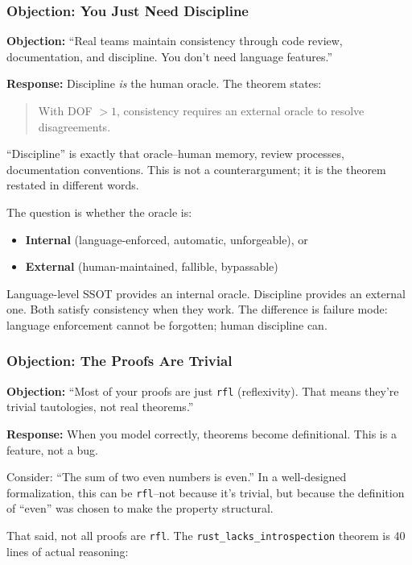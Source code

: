 \subsubsection{Objection: You Just Need Discipline}

\textbf{Objection:} ``Real teams maintain consistency through code review, documentation, and discipline. You don't need language features.''

\textbf{Response:} Discipline \emph{is} the human oracle. The theorem states:

\begin{quote}
With DOF $> 1$, consistency requires an external oracle to resolve disagreements.
\end{quote}

``Discipline'' is exactly that oracle--human memory, review processes, documentation conventions. This is not a counterargument; it is the theorem restated in different words.

The question is whether the oracle is:
\begin{itemize}
\tightlist
\item \textbf{Internal} (language-enforced, automatic, unforgeable), or
\item \textbf{External} (human-maintained, fallible, bypassable)
\end{itemize}

Language-level SSOT provides an internal oracle. Discipline provides an external one. Both satisfy consistency when they work. The difference is failure mode: language enforcement cannot be forgotten; human discipline can.

\subsubsection{Objection: The Proofs Are Trivial}

\textbf{Objection:} ``Most of your proofs are just \texttt{rfl} (reflexivity). That means they're trivial tautologies, not real theorems.''

\textbf{Response:} When you model correctly, theorems become definitional. This is a feature, not a bug.

Consider: ``The sum of two even numbers is even.'' In a well-designed formalization, this can be \texttt{rfl}--not because it's trivial, but because the definition of ``even'' was chosen to make the property structural.

That said, not all proofs are \texttt{rfl}. The \texttt{rust\_lacks\_introspection} theorem is 40 lines of actual reasoning:

